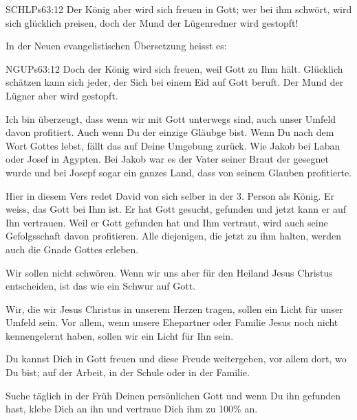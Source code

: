 \documentclass[14pt]{mybib}
\begin{document}
\begin{otsblock}
    \begin{bibelbox}{SCHL}{Ps}{63:12}
        Der König aber wird sich freuen in Gott; wer bei ihm schwört, wird sich glücklich preisen, doch der Mund der Lügenredner wird gestopft!
    \end{bibelbox}
    In der Neuen evangelistischen Übersetzung heisst es:
    \begin{bibelbox}{NGU}{Ps}{63:12}
        Doch der König wird sich freuen, weil Gott zu Ihm hält. Glücklich schätzen kann sich jeder, der Sich bei einem Eid auf Gott beruft. Der Mund der Lügner aber wird gestopft.
    \end{bibelbox}
    \begin{otsblock}
        Ich bin überzeugt, dass wenn wir mit Gott unterwegs sind, auch unser Umfeld davon profitiert. Auch wenn Du der einzige Gläubge bist. Wenn Du nach dem Wort Gottes lebst, fällt das auf Deine Umgebung zurück. Wie Jakob bei Laban oder Josef in Agypten. Bei Jakob war es der Vater seiner Braut der gesegnet wurde und bei Josepf sogar ein ganzes Land, dass von seinem Glauben profitierte.

        Hier in diesem Vers redet David von sich selber in der 3. Person als König. Er weiss, das Gott bei Ihm ist. Er hat Gott gesucht, gefunden und jetzt kann er auf Ihn vertrauen. Weil er Gott gefunden hat und Ihm vertraut, wird auch seine Gefolgsschaft davon profitieren. Alle diejenigen, die jetzt zu ihm halten, werden auch die Gnade Gottes erleben.

        Wir sollen nicht schwören. Wenn wir uns aber für den Heiland Jesus Christus entscheiden, ist das wie ein Schwur auf Gott.
    \end{otsblock}
    \begin{otsblock}
        Wir, die wir Jesus Christus in unserem Herzen tragen, sollen ein Licht für unser Umfeld sein. Vor allem, wenn unsere Ehepartner oder Familie Jesus noch nicht kennengelernt haben, sollen wir ein Licht für Ihn sein.     

        Du kannst Dich in Gott freuen und diese Freude weitergeben, vor allem dort, wo Du bist; auf der Arbeit, in der Schule oder in der Familie.
\end{otsblock}
    Suche täglich in der Früh Deinen persönlichen Gott und wenn Du ihn gefunden hast, klebe Dich an ihn und vertraue Dich ihm zu 100\% an.\\
    \\
    \beten
\end{otsblock}  
\end{document}
